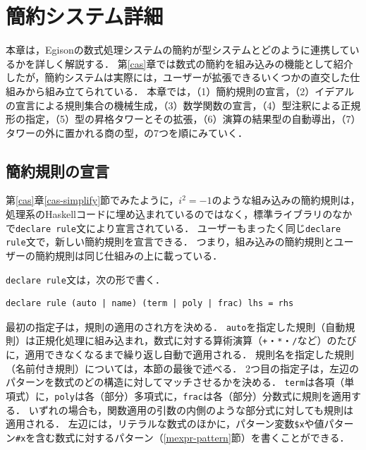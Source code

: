 \chapter{簡約システム詳細}\label{casdetail}

本章は，Egisonの数式処理システムの簡約が型システムとどのように連携しているかを詳しく解説する．
第\ref{cas}章では数式の簡約を組み込みの機能として紹介したが，簡約システムは実際には，ユーザーが拡張できるいくつかの直交した仕組みから組み立てられている．
本章では，（1）簡約規則の宣言，（2）イデアルの宣言による規則集合の機械生成，（3）数学関数の宣言，（4）型注釈による正規形の指定，（5）型の昇格タワーとその拡張，（6）演算の結果型の自動導出，（7）タワーの外に置かれる商の型，の7つを順にみていく．

\section{簡約規則の宣言}\label{cas-rule}

第\ref{cas}章\ref{cas-simplify}節でみたように，$i^2 = -1$のような組み込みの簡約規則は，処理系のHaskellコードに埋め込まれているのではなく，標準ライブラリのなかで\lstinline{declare rule}文により宣言されている．
ユーザーもまったく同じ\lstinline{declare rule}文で，新しい簡約規則を宣言できる．
つまり，組み込みの簡約規則とユーザーの簡約規則は同じ仕組みの上に載っている．

\lstinline{declare rule}文は，次の形で書く．
\begin{lstlisting}[language=egison,numbers=none]
declare rule (auto | name) (term | poly | frac) lhs = rhs
\end{lstlisting}
最初の指定子は，規則の適用のされ方を決める．
\lstinline{auto}を指定した規則（自動規則）は正規化処理に組み込まれ，数式に対する算術演算（\lstinline{+}・\lstinline{*}・\lstinline{/}など）のたびに，適用できなくなるまで繰り返し自動で適用される．
規則名を指定した規則（名前付き規則）については，本節の最後で述べる．
2つ目の指定子は，左辺のパターンを数式のどの構造に対してマッチさせるかを決める．
\lstinline{term}は各項（単項式）に，\lstinline{poly}は各（部分）多項式に，\lstinline{frac}は各（部分）分数式に規則を適用する．
いずれの場合も，関数適用の引数の内側のような部分式に対しても規則は適用される．
左辺には，リテラルな数式のほかに，パターン変数\lstinline{$x}や値パターン\lstinline{#x}を含む数式に対するパターン（\ref{mexpr-pattern}節）を書くことができる．

